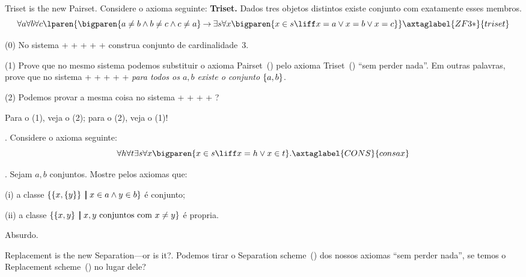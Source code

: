 {%
\problem Triset is the new Pairset.
\label{triset_problem}%
Considere o axioma seguinte:
\endgraf\noindent
{\bf Triset.}
{\proclaimstyle
Dados tres objetos distintos existe conjunto com exatamente
esses membros.
}
$$
\forall a
\forall b
\forall c
\lparen{
\bigparen{
a\neq b \land b \neq c \land c \neq a
}
\limplies
\exists s
\forall x
\bigparen{x\in s \liff x = a \lor x = b \lor x = c}
}
\axtaglabel{ZF3*}{triset}
$$
\item{(0)}
No sistema
%
+%
+%
+%
+%
+
construa conjunto de cardinalidade~$3$.
\item{(1)}
Prove que no mesmo sistema
podemos substituir o axioma Pairset~() pelo axioma
Triset~() ``sem perder nada''.
Em outras palavras, prove que no sistema
%
+%
+%
+%
+%
+
\emph{para todos os $a,b$ existe o conjunto $\left\{a,b\right\}$}.
\item{(2)}
Podemos provar a mesma coisa no sistema
%
+%
+%
+%
+%
?

\hint
Para o (1), veja o (2); para o (2), veja o (1)!

\endproblem

\problem.
\label{consax_problem}%
Considere o axioma seguinte:
$$
\forall h
\forall t
\exists s
\forall x
\bigparen{
x \in s
\liff
x = h
\lor
x \in t
}.
\axtaglabel{CONS}{consax}
$$

\endproblem

\problem.
\label{one_class_set_the_other_proper_problem}%
Sejam $a,b$ conjuntos.
Mostre pelos axiomas que:
\item{(i)}  a classe $\left\{ \left\{x,\left\{y\right\}\right\} \;\mathord{\pmb{\mid}}\; x \in a \land y \in b\right\}$ é conjunto;
\item{(ii)} a classe $\left\{ \left\{x,y\right\} \;\mathord{\pmb{\mid}}\; \text{$x,y$ conjuntos com $x\neq y$}\right\}$ é propria.

\hint
Absurdo.

\endproblem

\problem Replacement is the new Separation---or is it?.
\label{replacement_replaces_separation}%
Podemos tirar o Separation scheme~()
dos nossos axiomas ``sem perder nada'', se temos o
Replacement scheme~() no lugar dele?

}
